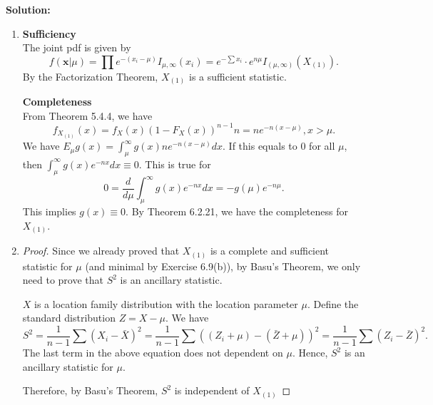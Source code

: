 \documentclass[11pt]{article}
\newcommand{\x}{\mathbf{x}}
\newcommand{\Sol}{\par {\bf Solution:}}
\begin{document}
\Sol
\begin{enumerate}[label=(\alph*)]
    \item 
    \textbf{Sufficiency} \\
    The joint pdf is given by
    $$f(\x|\mu) = \prod e^{-(x_i-\mu)}I_{\mu, \infty}(x_i) =  e^{-\sum x_i} \cdot e^{n\mu} I_{(\mu, \infty)}(X_{(1)}).$$
    By the Factorization Theorem, $X_{(1)}$ is a sufficient statistic.
    
    \textbf{Completeness} \\
    From Theorem 5.4.4, we have
    $$f_{X_{(1)}}(x) = f_X(x)(1 - F_X(x))^{n-1}n = ne^{-n(x-\mu)}, x > \mu.$$
    We have $E_\mu g(x) = \int_\mu^\infty g(x) ne^{-n(x-\mu)} dx$. If this equals to 0 for all $\mu$, then $\int_\mu^\infty g(x) e^{-nx} dx \equiv 0$. This is true for
    \[
    0 = \frac{d}{d\mu} \int_\mu^\infty g(x) e^{-nx} dx = - g(\mu)e^{-n\mu}.
    \]
    This implies $g(x) \equiv 0$. By Theorem 6.2.21, we have the completeness for $X_{(1)}$.
    \item 
    \begin{proof}
    Since we already proved that $X_{(1)}$ is a complete and sufficient statistic for $\mu$ (and minimal by Exercise 6.9(b)), by Basu's Theorem, we only need to prove that $S^2$ is an ancillary statistic.

    $X$ is a location family distribution with the location parameter $\mu$. Define the standard distribution $Z = X - \mu$. We have
    \[
    S^2 = \frac{1}{n-1}\sum(X_i - \bar X)^2 =  \frac{1}{n-1}\sum((Z_i + \mu) - (\bar Z + \mu))^2 = \frac{1}{n-1}\sum(Z_i - \bar Z)^2.
    \]
    The last term in the above equation does not dependent on $\mu$. Hence, $S^2$ is an ancillary statistic for $\mu$.

    Therefore, by Basu's Theorem, $S^2$ is independent of $X_{(1)}$
    \end{proof}
\end{enumerate}
\end{document}
